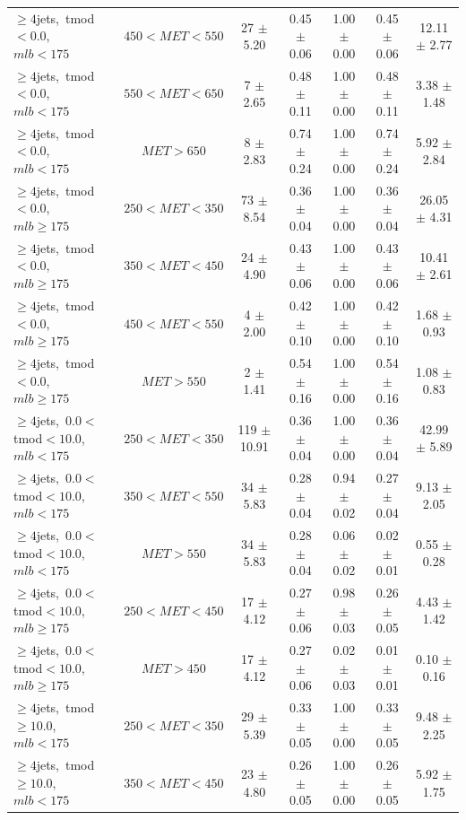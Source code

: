 \begin{table}
\begin{tabular}{|l|c|c|c|c|c|c|}
 $\ge4$jets,~tmod$<0.0$,~$mlb<175$ & $450<MET<550$  & 27 $\pm$ 5.20  & 0.45 $\pm$ 0.06  & 1.00 $\pm$ 0.00 & 0.45 $\pm$ 0.06  & 12.11 $\pm$ 2.77  \\
 $\ge4$jets,~tmod$<0.0$,~$mlb<175$ & $550<MET<650$  & 7 $\pm$ 2.65  & 0.48 $\pm$ 0.11  & 1.00 $\pm$ 0.00 & 0.48 $\pm$ 0.11  & 3.38 $\pm$ 1.48  \\
 $\ge4$jets,~tmod$<0.0$,~$mlb<175$ & $MET>650$  & 8 $\pm$ 2.83  & 0.74 $\pm$ 0.24  & 1.00 $\pm$ 0.00 & 0.74 $\pm$ 0.24  & 5.92 $\pm$ 2.84  \\
\hline
 $\ge4$jets,~tmod$<0.0$,~$mlb\ge175$ & $250<MET<350$  & 73 $\pm$ 8.54  & 0.36 $\pm$ 0.04  & 1.00 $\pm$ 0.00 & 0.36 $\pm$ 0.04  & 26.05 $\pm$ 4.31  \\
 $\ge4$jets,~tmod$<0.0$,~$mlb\ge175$ & $350<MET<450$  & 24 $\pm$ 4.90  & 0.43 $\pm$ 0.06  & 1.00 $\pm$ 0.00 & 0.43 $\pm$ 0.06  & 10.41 $\pm$ 2.61  \\
 $\ge4$jets,~tmod$<0.0$,~$mlb\ge175$ & $450<MET<550$  & 4 $\pm$ 2.00  & 0.42 $\pm$ 0.10  & 1.00 $\pm$ 0.00 & 0.42 $\pm$ 0.10  & 1.68 $\pm$ 0.93  \\
 $\ge4$jets,~tmod$<0.0$,~$mlb\ge175$ & $MET>550$  & 2 $\pm$ 1.41  & 0.54 $\pm$ 0.16  & 1.00 $\pm$ 0.00 & 0.54 $\pm$ 0.16  & 1.08 $\pm$ 0.83  \\
\hline
 $\ge4$jets,~$0.0<$tmod$<10.0$,~$mlb<175$ & $250<MET<350$  & 119 $\pm$ 10.91  & 0.36 $\pm$ 0.04  & 1.00 $\pm$ 0.00 & 0.36 $\pm$ 0.04  & 42.99 $\pm$ 5.89  \\
 $\ge4$jets,~$0.0<$tmod$<10.0$,~$mlb<175$ & $350<MET<550$  & 34 $\pm$ 5.83  & 0.28 $\pm$ 0.04  & 0.94 $\pm$ 0.02 & 0.27 $\pm$ 0.04  & 9.13 $\pm$ 2.05  \\
 $\ge4$jets,~$0.0<$tmod$<10.0$,~$mlb<175$ & $MET>550$  & 34 $\pm$ 5.83  & 0.28 $\pm$ 0.04  & 0.06 $\pm$ 0.02 & 0.02 $\pm$ 0.01  & 0.55 $\pm$ 0.28  \\
\hline
 $\ge4$jets,~$0.0<$tmod$<10.0$,~$mlb\ge175$ & $250<MET<450$  & 17 $\pm$ 4.12  & 0.27 $\pm$ 0.06  & 0.98 $\pm$ 0.03 & 0.26 $\pm$ 0.05  & 4.43 $\pm$ 1.42  \\
 $\ge4$jets,~$0.0<$tmod$<10.0$,~$mlb\ge175$ & $MET>450$  & 17 $\pm$ 4.12  & 0.27 $\pm$ 0.06  & 0.02 $\pm$ 0.03 & 0.01 $\pm$ 0.01  & 0.10 $\pm$ 0.16  \\
\hline
 $\ge4$jets,~tmod$\ge10.0$,~$mlb<175$ & $250<MET<350$  & 29 $\pm$ 5.39  & 0.33 $\pm$ 0.05  & 1.00 $\pm$ 0.00 & 0.33 $\pm$ 0.05  & 9.48 $\pm$ 2.25  \\
 $\ge4$jets,~tmod$\ge10.0$,~$mlb<175$ & $350<MET<450$  & 23 $\pm$ 4.80  & 0.26 $\pm$ 0.05  & 1.00 $\pm$ 0.00 & 0.26 $\pm$ 0.05  & 5.92 $\pm$ 1.75  \\

\end{tabular}
\end{table}
